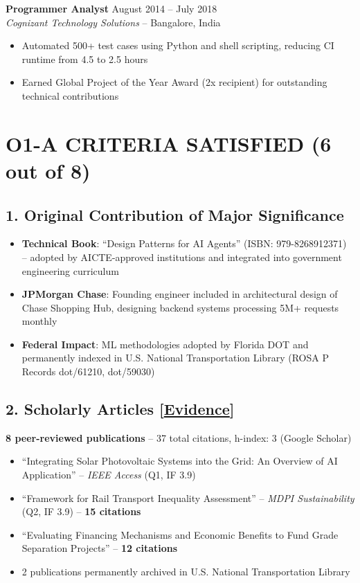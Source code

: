 \documentclass[11pt,letterpaper]{article}
\begin{document}
\textbf{Programmer Analyst} \hfill August 2014 -- July 2018\\
\textit{Cognizant Technology Solutions} -- Bangalore, India

\begin{itemize}
    \item Automated 500+ test cases using Python and shell scripting, reducing CI runtime from 4.5 to 2.5 hours
    \item Earned Global Project of the Year Award (2x recipient) for outstanding technical contributions
\end{itemize}

\section*{O1-A CRITERIA SATISFIED (6 out of 8)}

\subsection*{1. Original Contribution of Major Significance}

\begin{itemize}
    \item \textbf{Technical Book}: ``Design Patterns for AI Agents'' (ISBN: 979-8268912371) -- adopted by AICTE-approved institutions and integrated into government engineering curriculum
    \item \textbf{JPMorgan Chase}: Founding engineer included in architectural design of Chase Shopping Hub, designing backend systems processing 5M+ requests monthly
    \item \textbf{Federal Impact}: ML methodologies adopted by Florida DOT and permanently indexed in U.S. National Transportation Library (ROSA P Records dot/61210, dot/59030)
\end{itemize}

\subsection*{2. Scholarly Articles [\href{https://scholar.google.com/citations?user=BvG76iMAAAAJ&hl=en}{Evidence}]}

\textbf{8 peer-reviewed publications} -- 37 total citations, h-index: 3 (Google Scholar)
\begin{itemize}
    \item ``Integrating Solar Photovoltaic Systems into the Grid: An Overview of AI Application'' -- \textit{IEEE Access} (Q1, IF 3.9)
    \item ``Framework for Rail Transport Inequality Assessment'' -- \textit{MDPI Sustainability} (Q2, IF 3.9) -- \textbf{15 citations}
    \item ``Evaluating Financing Mechanisms and Economic Benefits to Fund Grade Separation Projects'' -- \textbf{12 citations}
    \item 2 publications permanently archived in U.S. National Transportation Library
\end{itemize}
\end{document}

